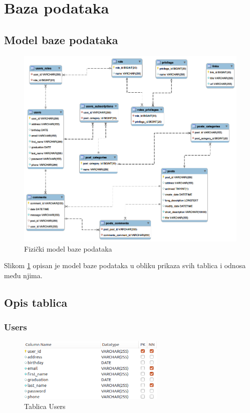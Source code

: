 \documentclass[zavrsni, numeric]{fer}
\begin{document}
\section{Baza podataka}
\subsection{Model baze podataka}

\begin{figure}[H]
	\centering
	\includegraphics[width=13cm]{slike/fizicki-model.png}
	\caption{Fizički model baze podataka}
	\label{fig:fizicki-model}
\end{figure}

Slikom \ref{fig:fizicki-model} opisan je model baze podataka u obliku prikaza svih tablica i odnosa među njima.

\subsection{Opis tablica}

\subsubsection{Users}

\begin{figure}[H]
	\centering
	\includegraphics[width=7cm]{slike/t-users.png}
	\caption{Tablica Users}
	\label{fig:t-users}
\end{figure}
\end{document}
